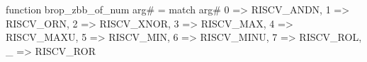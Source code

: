 function brop_zbb_of_num arg# = match arg# {
  0 => RISCV_ANDN,
  1 => RISCV_ORN,
  2 => RISCV_XNOR,
  3 => RISCV_MAX,
  4 => RISCV_MAXU,
  5 => RISCV_MIN,
  6 => RISCV_MINU,
  7 => RISCV_ROL,
  _ => RISCV_ROR
}

